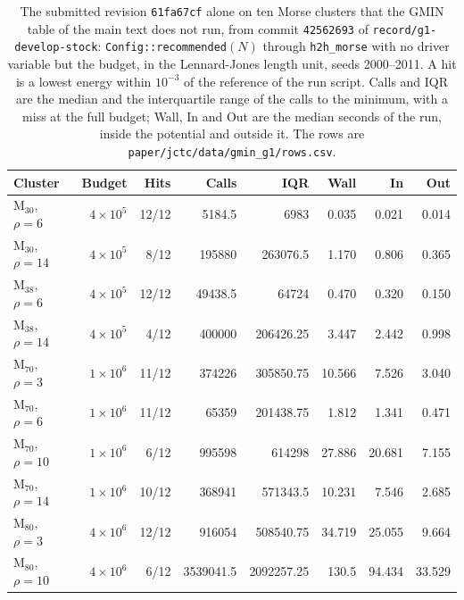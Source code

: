 \documentclass[journal=jctcce,manuscript=suppinfo]{achemso}
\begin{document}
\begin{table}
\caption{The submitted revision \texttt{61fa67cf} alone on ten Morse clusters that
the GMIN table of the main text does not run, from commit \texttt{42562693} of
\texttt{record/g1-develop-stock}: \texttt{Config::recommended}\((N)\) through
\texttt{h2h\_morse} with no driver variable but the budget, in the Lennard-Jones length
unit, seeds 2000--2011.
A hit is a lowest energy within \(10^{-3}\) of the reference of the run script.
Calls and IQR are the median and the interquartile range of the calls to the minimum,
with a miss at the full budget; Wall, In and Out are the median seconds of the run,
inside the potential and outside it.
The rows are \texttt{paper/jctc/data/gmin\_g1/rows.csv}.}
\label{tab:si-morse-g1}
\centering
\begin{tabular}{@{}lrrrrrrr@{}}
\toprule
Cluster & Budget & Hits & Calls & IQR & Wall & In & Out \\
\midrule
M\(_{30}\), \(\rho=6\) & \(4\times 10^{5}\) & 12/12 & 5184.5 & 6983 & 0.035 & 0.021 & 0.014 \\
M\(_{30}\), \(\rho=14\) & \(4\times 10^{5}\) & 8/12 & 195880 & 263076.5 & 1.170 & 0.806 & 0.365 \\
M\(_{38}\), \(\rho=6\) & \(4\times 10^{5}\) & 12/12 & 49438.5 & 64724 & 0.470 & 0.320 & 0.150 \\
M\(_{38}\), \(\rho=14\) & \(4\times 10^{5}\) & 4/12 & 400000 & 206426.25 & 3.447 & 2.442 & 0.998 \\
M\(_{70}\), \(\rho=3\) & \(1\times 10^{6}\) & 11/12 & 374226 & 305850.75 & 10.566 & 7.526 & 3.040 \\
M\(_{70}\), \(\rho=6\) & \(1\times 10^{6}\) & 11/12 & 65359 & 201438.75 & 1.812 & 1.341 & 0.471 \\
M\(_{70}\), \(\rho=10\) & \(1\times 10^{6}\) & 6/12 & 995598 & 614298 & 27.886 & 20.681 & 7.155 \\
M\(_{70}\), \(\rho=14\) & \(1\times 10^{6}\) & 10/12 & 368941 & 571343.5 & 10.231 & 7.546 & 2.685 \\
M\(_{80}\), \(\rho=3\) & \(4\times 10^{6}\) & 12/12 & 916054 & 508540.75 & 34.719 & 25.055 & 9.664 \\
M\(_{80}\), \(\rho=10\) & \(4\times 10^{6}\) & 6/12 & 3539041.5 & 2092257.25 & 130.5 & 94.434 & 33.529 \\
\bottomrule
\end{tabular}
\end{table}
\end{document}
